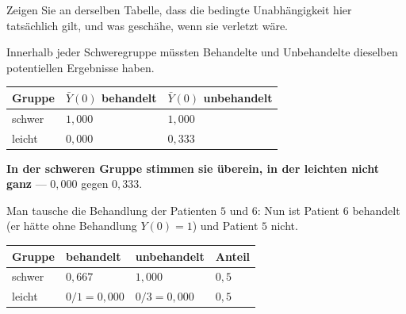 \begin{aufgabe}
Zeigen Sie an derselben Tabelle, dass die bedingte Unabhängigkeit hier tatsächlich gilt, und was geschähe, wenn sie verletzt wäre.

\loesung
{}
Innerhalb jeder Schweregruppe müssten Behandelte und Unbehandelte dieselben potentiellen Ergebnisse haben.

\begin{center}
{\small
\renewcommand{\arraystretch}{1.46}
\begin{tabular}{@{}P{1.8cm}P{2.6cm}P{2.6cm}@{}}
\toprule
\textbf{Gruppe} & $\bar Y(0)$ behandelt & $\bar Y(0)$ unbehandelt\\
\midrule
schwer & $1{,}000$ & $1{,}000$\\
leicht & $0{,}000$ & $0{,}333$\\
\bottomrule
\end{tabular}}
\end{center}

\begin{center}
\begin{minipage}{0.9\textwidth}
\textbf{In der schweren Gruppe stimmen sie überein, in der leichten nicht ganz} --- $0{,}000$ gegen $0{,}333$.
\end{minipage}
\end{center}

\begin{center}
\begin{minipage}{0.88\textwidth}
\end{minipage}
\end{center}

Man tausche die Behandlung der Patienten $5$ und $6$: Nun ist Patient $6$ behandelt (er hätte ohne Behandlung $Y(0)=1$) und Patient $5$ nicht.

\begin{center}
{\small
\renewcommand{\arraystretch}{1.46}
\begin{tabular}{@{}P{1.8cm}P{2.4cm}P{2.4cm}P{1.6cm}@{}}
\toprule
\textbf{Gruppe} & \textbf{behandelt} & \textbf{unbehandelt} & \textbf{Anteil}\\
\midrule
schwer & $0{,}667$ & $1{,}000$ & $0{,}5$\\
leicht & $0/1 = 0{,}000$ & $0/3 = 0{,}000$ & $0{,}5$\\
\bottomrule
\end{tabular}}
\end{center}


\end{aufgabe}
